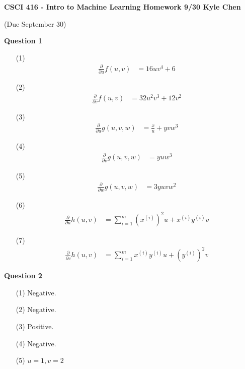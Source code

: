 \documentclass[12pt]{article} %
\newcommand{\D}{\partial}
\begin{document}
 
\noindent
\textbf{CSCI 416 - Intro to Machine Learning \quad 
Homework 9/30 \hfill Kyle Chen}\\
\begin{center}
  (Due September 30)
\end{center}
\bigskip

\begin{flushleft} %

\textbf{Question 1} 
\begin{enumerate}
	\item[(1)]
		\begin{align*}
			\frac{\D}{\D u}f(u,v) &= 16uv^4+6
		\end{align*}
	\item[(2)]
		\begin{align*}
			\frac{\D}{\D v}f(u,v) &= 32u^2v^3+12v^2
		\end{align*}
	\item[(3)]
		\begin{align*}
			\frac{\D}{\D u}g(u,v,w) &= \frac{x}{u}+yvw^3
		\end{align*}
	\item[(4)]	
		\begin{align*}
			\frac{\D}{\D v}g(u,v,w) &= yuw^3
		\end{align*}
	\item[(5)]
		\begin{align*}
			\frac{\D}{\D w}g(u,v,w) &= 3yuvw^2
		\end{align*}
	\item[(6)]
		\begin{align*}
			\frac{\D}{\D u}h(u,v) &= \sum^m_{i = 1}{(x^{(i)})^2 u+x^{(i)}y^{(i)}v}
		\end{align*}
	\item[(7)]
		\begin{align*}
			\frac{\D}{\D v}h(u,v) &= \sum^m_{i = 1}{x^{(i)}y^{(i)}u+(y^{(i)})^2v}
		\end{align*}
\end{enumerate}

\newpage
\textbf{Question 2} 
\begin{enumerate}
	\item[(1)] Negative.
	\item[(2)] Negative.
	\item[(3)] Positive.
	\item[(4)]	Negative.
	\item[(5)] $u = 1, v = 2$ 
\end{enumerate}


\end{flushleft}
\end{document}
